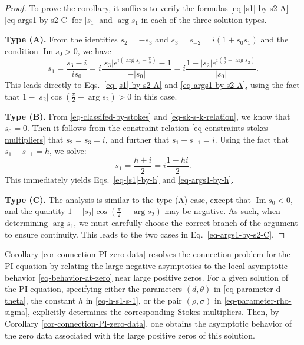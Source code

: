 \documentclass[12pt]{article}
\theoremstyle{plain}
\theoremstyle{definition}
\numberwithin{equation}{section}
\renewcommand\Im{\operatorname{Im}}
\begin{document}
\begin{proof}
To prove the corollary, it suffices to verify the formulas \eqref{eq-|s1|-by-s2-A}–\eqref{eq-args1-by-s2-C} for \( |s_{1}| \) and \( \arg s_{1} \) in each of the three solution types.

\smallskip
\noindent
\textbf{Type (A).} From the identities \( s_{2} = -\overline{s_{3}} \) and \( s_{3} = s_{-2} = i(1 + s_{0}s_{1}) \) and the condition \( \Im s_{0} > 0 \), we have
\begin{equation}
s_{1} = \frac{s_{3} - i}{i s_{0}} = i \frac{|s_{3}| e^{i(\arg s_{3} - \frac{\pi}{2})} - 1}{-|s_{0}|}
= i \frac{1 - |s_{2}| e^{i(\frac{\pi}{2} - \arg s_{2})}}{|s_{0}|}.
\end{equation}
This leads directly to Eqs.~\eqref{eq-|s1|-by-s2-A} and \eqref{eq-args1-by-s2-A}, using the fact that \( 1 - |s_{2}| \cos(\tfrac{\pi}{2} - \arg s_{2}) > 0 \) in this case.

\smallskip
\noindent
\textbf{Type (B).} From \eqref{eq-classifed-by-stokes} and \eqref{eq-sk-s-k-relation}, we know that\( s_{0} = 0 \). Then it follows from the constraint relation \eqref{eq-constraints-stokes-multipliers} that \( s_{2} = s_{3} = i \), and further that \( s_{1} + s_{-1} = i \). Using the fact that \( s_{1} - s_{-1} = h \), we solve:
\[
s_{1} = \frac{h + i}{2} = i \frac{1 - hi}{2}.
\]
This immediately yields Eqs.~\eqref{eq-|s1|-by-h} and \eqref{eq-args1-by-h}.

\smallskip
\noindent
\textbf{Type (C).} The analysis is similar to the type (A) case, except that \( \Im s_{0} < 0 \), and the quantity \( 1 - |s_{2}| \cos(\tfrac{\pi}{2} - \arg s_{2}) \) may be negative. As such, when determining \( \arg s_{1} \), we must carefully choose the correct branch of the argument to ensure continuity. This leads to the two cases in Eq.~\eqref{eq-args1-by-s2-C}.
\end{proof}


Corollary \ref{cor-connection-PI-zero-data} resolves the connection problem for the PI equation by relating the large negative asymptotics to the local asymptotic behavior \eqref{eq-behavior-at-zero} near large positive zeros. For a given solution of the PI equation, specifying either the parameters $(d, \theta)$ in \eqref{eq-parameter-d-theta}, the constant $h$ in \eqref{eq-h-s1-s-1}, or the pair $(\rho, \sigma)$ in \eqref{eq-parameter-rho-sigma}, explicitly determines the corresponding Stokes multipliers. Then, by Corollary \ref{cor-connection-PI-zero-data}, one obtains the asymptotic behavior of the zero data associated with the large positive zeros of this solution.
\end{document}
